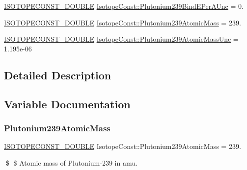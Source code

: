 \begin{DoxyCompactItemize}
\mbox{\hyperlink{group___isotope_const-_macros_ga8f45a7272ce02c0b4c65c44636ed719a}{I\+S\+O\+T\+O\+P\+E\+C\+O\+N\+S\+T\+\_\+\+D\+O\+U\+B\+LE}} \mbox{\hyperlink{group___isotope_const-_plutonium-_pu239_ga1290655e6368fcd6abe807faaaee4bf7}{Isotope\+Const\+::\+Plutonium239\+Bind\+E\+Per\+A\+Unc}} = 0.
\item 
\mbox{\hyperlink{group___isotope_const-_macros_ga8f45a7272ce02c0b4c65c44636ed719a}{I\+S\+O\+T\+O\+P\+E\+C\+O\+N\+S\+T\+\_\+\+D\+O\+U\+B\+LE}} \mbox{\hyperlink{group___isotope_const-_plutonium-_pu239_ga3b86e7940238f138e9aa7fc1b733cae6}{Isotope\+Const\+::\+Plutonium239\+Atomic\+Mass}} = 239.
\item 
\mbox{\hyperlink{group___isotope_const-_macros_ga8f45a7272ce02c0b4c65c44636ed719a}{I\+S\+O\+T\+O\+P\+E\+C\+O\+N\+S\+T\+\_\+\+D\+O\+U\+B\+LE}} \mbox{\hyperlink{group___isotope_const-_plutonium-_pu239_ga84819c0abd8543f6f778ac87b1171d5b}{Isotope\+Const\+::\+Plutonium239\+Atomic\+Mass\+Unc}} = 1.\+195e-\/06
\end{DoxyCompactItemize}


\subsection{Detailed Description}


\subsection{Variable Documentation}
\mbox{\label{group___isotope_const-_plutonium-_pu239_ga3b86e7940238f138e9aa7fc1b733cae6}} 
\subsubsection{\texorpdfstring{Plutonium239\+Atomic\+Mass}{Plutonium239AtomicMass}}
{\footnotesize\ttfamily \mbox{\hyperlink{group___isotope_const-_macros_ga8f45a7272ce02c0b4c65c44636ed719a}{I\+S\+O\+T\+O\+P\+E\+C\+O\+N\+S\+T\+\_\+\+D\+O\+U\+B\+LE}} Isotope\+Const\+::\+Plutonium239\+Atomic\+Mass = 239.}

\$ \$ Atomic mass of Plutonium-\/239 in amu. \mbox{\label{group___isotope_const-_plutonium-_pu239_ga84819c0abd8543f6f778ac87b1171d5b}} 
